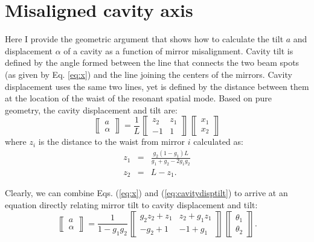 \section{Misaligned cavity axis}
\label{sec:misaligned_cavity}
Here I provide the geometric argument that shows how to calculate the
tilt $a$ and displacement $\alpha$ of a cavity as a function of mirror
misalignment. Cavity tilt is defined by the angle formed between
the line that connects the two beam spots (as given by Eq. \ref{eq:x}) and the line joining the
centers of the mirrors. Cavity displacement uses the same two lines,
yet is defined by the distance between them at the location of the
waist of the resonant spatial mode. Based on pure geometry, the cavity
displacement and tilt are:
\begin{equation}
\left\llbracket \begin{array}{c}
a \\
\alpha \end{array} \right\rrbracket = \frac{1}{L}
\left\llbracket \begin{array}{cc}
z_2 & z_1\\
-1 & 1\end{array} \right\rrbracket
\left\llbracket \begin{array}{c}
x_1\\
x_2 \end{array} \right\rrbracket
\label{eq:cavitydisptilt}
\end{equation}
where $z_i$ is the distance to the waist from mirror $i$ calculated as:
\begin{eqnarray}
z_1 &=& \frac{g_2 (1-g_1) L}{g_1+g_2 - 2 g_1g_2} \\
z_2 &=& L - z_1.
\end{eqnarray}

Clearly, we can combine Eqs. (\ref{eq:x}) and
(\ref{eq:cavitydisptilt}) to arrive at an equation directly relating
mirror tilt to cavity displacement and tilt: 
\begin{equation}
\left\llbracket \begin{array}{c}
a \\
\alpha \end{array} \right\rrbracket = \frac{1}{1-g_1g_2}
\left\llbracket \begin{array}{cc}
g_2z_2 + z_1 & z_2 + g_1z_1\\
-g_2 + 1 & -1 + g_1\end{array} \right\rrbracket
\left\llbracket \begin{array}{c}
\theta_1\\
\theta_2 \end{array} \right\rrbracket.
\label{eq:cavitydisptilt_mirrorangle}
\end{equation}



